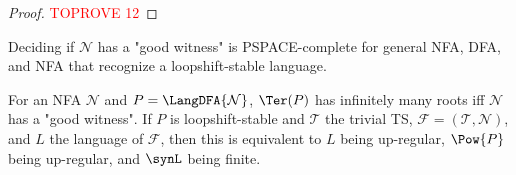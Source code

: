 \documentclass[a4paper,USenglish,cleveref,autoref,thm-restate]{lipics-v2021}
\newcommand{\mc}[1]{\ensuremath{\mathcal{#1}}}
\newcommand{\T}{\mc{T}}
\newcommand{\F}{\mc{F}}
\newcommand{\N}{\mc{N}}
\newcommand{\PSPACE}{\textsf{PSPACE}\xspace}
\begin{document}
\begin{proof}\textcolor{red}{TOPROVE 12}\end{proof}

























































\iffalse
  \begin{corollary}
    Deciding if $\N$ has a "good witness" is \PSPACE-complete for general NFA, DFA, and NFA that recognize a loopshift-stable language.

    For an NFA $\N$ and $P = \LangDFA{\N}$, $\Ter(P)$ has infinitely many roots iff $\N$ has a "good witness".
    If $P$ is loopshift-stable and $\T$ the trivial TS, $\F = (\T,\N)$, and $L$ the language of $\F$, then this is equivalent to $L$ being up-regular, $\Pow{P}$ being up-regular, and $\synL$ being finite.
  \end{corollary}
\end{document}
